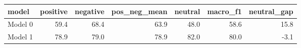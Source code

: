 \begin{tabular}{lrrrrrr}
\toprule
  model &  positive &  negative &  pos\_neg\_mean &  neutral &  macro\_f1 &  neutral\_gap \\
\midrule
Model 0 &      59.4 &      68.4 &          63.9 &     48.0 &      58.6 &         15.8 \\
Model 1 &      78.9 &      79.0 &          78.9 &     82.0 &      80.0 &         -3.1 \\
\bottomrule
\end{tabular}
